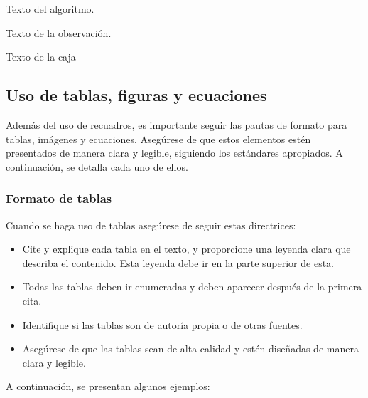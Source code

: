 \documentclass[fleqn]{Paquetes/RevDigMatEduInt}
\begin{document}
\begin{algoritmo}
	Texto del algoritmo.
\end{algoritmo}

\begin{observacion}
	Texto de la observación.
\end{observacion}

\begin{caja}
	Texto de la caja
\end{caja}


\subsection{Uso de tablas, figuras y ecuaciones}
Además del uso de recuadros, es importante seguir las pautas de formato para tablas, imágenes y ecuaciones. Asegúrese de que estos elementos estén presentados de manera clara y legible, siguiendo los estándares apropiados. A continuación, se detalla cada uno de ellos.

\subsubsection{Formato de tablas}

Cuando se haga uso de tablas asegúrese de seguir estas directrices:

\begin{itemize}
\item Cite y explique cada tabla en el texto, y proporcione una leyenda clara que describa el contenido. Esta leyenda debe ir en la parte superior de esta.
\item Todas las tablas deben ir enumeradas y deben aparecer después de la primera cita.
\item Identifique si las tablas son de autoría propia o de otras fuentes.
\item Asegúrese de que las tablas sean de alta calidad y estén diseñadas de manera clara y legible.

\end{itemize}

A continuación, se presentan algunos ejemplos:
\end{document}
